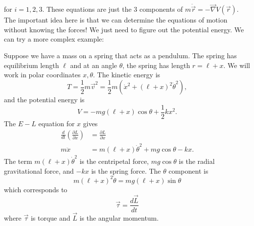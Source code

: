 \documentclass{article}
\numberwithin{equation}{section}
\begin{document}
for $i=1,2,3$. These equations are just the $3$ components of $m\ddot{\vec{r}} = - \vec{\nabla} V(\vec{r})$. The important idea here is that we can determine the equations of motion without knowing the forces! We just need to figure out the potential energy. We can try a more complex example:
\begin{example}
    Suppose we have a mass on a spring that acts as a pendulum. The spring has equilibrium length $\ell$ and at an angle $\theta$, the spring has length $r=\ell + x$. We will work in polar coordinates $x,\theta.$ The kinetic energy is
    \begin{equation}
        T = \frac{1}{2}m\vec{v}^2 = \frac{1}{2}m\left(\dot{x}^2 + (\ell+x)^2\dot{\theta}^2\right),
    \end{equation}
    and the potential energy is
    \begin{equation}
        V = -mg(\ell+x)\cos\theta + \frac{1}{2}kx^2.
    \end{equation}
    The $E-L$ equation for $x$ gives
    \begin{align}
        \frac{d}{dt}\left(\frac{\partial L}{\partial \dot{x}}\right) &= \frac{\partial L}{\partial x} \\
        m\ddot{x} &= m(\ell + x)\dot{\theta}^2 + mg\cos\theta - kx.
    \end{align}
    The term $m(\ell + x)\dot{\theta}^2$ is the centripetal force, $mg\cos\theta$ is the radial gravitational force, and $-kx$ is the spring force. The $\theta$ component is 
    \begin{equation}
        m(\ell + x)^2\dot{\theta} = mg(\ell + x)\sin\theta
    \end{equation}
    which corresponds to 
    \begin{equation}
        \vec{\tau} = \frac{d\vec{L}}{dt}
    \end{equation}
    where $\vec{\tau}$ is torque and $\vec{L}$ is the angular momentum.
\end{example}
\end{document}
